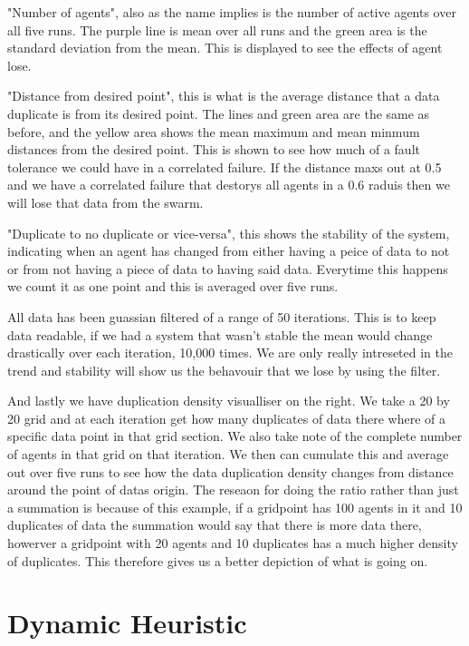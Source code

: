 \documentclass{UoYCSproject}
\begin{document}
"Number of agents", also as the name implies is the number of active agents over all five runs.
The purple line is mean over all runs and the green area is the standard deviation from the mean.
This is displayed to see the effects of agent lose.

"Distance from desired point", this is what is the average distance that a data duplicate is from its desired point.
The lines and green area are the same as before, and the yellow area shows the mean maximum and mean minmum distances from the desired point.
This is shown to see how much of a fault tolerance we could have in a correlated failure.
If the distance maxs out at 0.5 and we have a correlated failure that destorys all agents in a 0.6 raduis then we will lose that data from the swarm.

"Duplicate to no duplicate or vice-versa", this shows the stability of the system, indicating when an agent has changed from either having a peice of data to not or from not having a piece of data to having said data.
Everytime this happens we count it as one point and this is averaged over five runs.

All data has been guassian filtered of a range of 50 iterations.
This is to keep data readable, if we had a system that wasn't stable the mean would change drastically over each iteration, 10,000 times.
We are only really intreseted in the trend and stability will show us the behavouir that we lose by using the filter.

And lastly we have duplication density visualliser on the right.
We take a 20 by 20 grid and at each iteration get how many duplicates of data there where of a specific data point in that grid section.
We also take note of the complete number of agents in that grid on that iteration.
We then can cumulate this and average out over five runs to see how the data duplication density changes from distance around the point of datas origin.
The reseaon for doing the ratio rather than just a summation is because of this example, if a gridpoint has 100 agents in it and 10 duplicates of data the summation would say that there is more data there, howerver a gridpoint with 20 agents and 10 duplicates has a much higher density of duplicates.
This therefore gives us a better depiction of what is going on.



\section{Dynamic Heuristic}
\label{sec:Simple3a}
\end{document}
